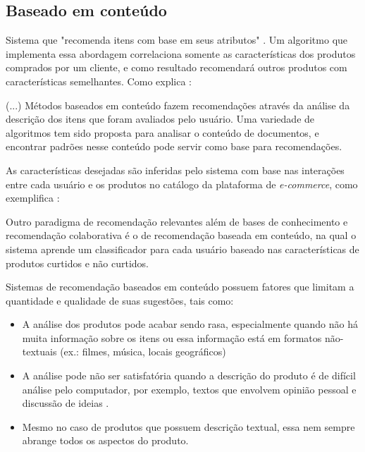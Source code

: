 \subsection{Baseado em conteúdo}
Sistema que "recomenda itens com base em seus atributos" \cite{fressato19}. Um algoritmo que implementa essa abordagem correlaciona somente as características dos produtos comprados por um cliente, e como resultado recomendará outros produtos com características semelhantes. Como explica :

\begin{citacao}
(...) Métodos baseados em conteúdo fazem recomendações através da análise da descrição dos itens que foram avaliados pelo usuário. Uma variedade de algoritmos tem sido proposta para analisar o conteúdo de documentos, e encontrar padrões nesse conteúdo pode servir como base para recomendações.
\end{citacao}

As características desejadas são inferidas pelo sistema com base nas interações entre cada usuário e os produtos no catálogo da plataforma de \textit{e-commerce}, como exemplifica :

\begin{citacao}
Outro paradigma de recomendação relevantes além de bases de conhecimento e recomendação colaborativa é o de recomendação baseada em conteúdo, na qual o sistema aprende um classificador para cada usuário baseado nas características de produtos curtidos e não curtidos.
\end{citacao}

Sistemas de recomendação baseados em conteúdo possuem fatores que limitam a quantidade e qualidade de suas sugestões, tais como:

\begin{itemize}
    \item A análise dos produtos pode acabar sendo rasa, especialmente quando não há muita informação sobre os itens ou essa informação está em formatos não-textuais (ex.: filmes, música, locais geográficos)  \cite{balabanovi97}
    \item A análise pode não ser satisfatória quando a descrição do produto é de difícil análise pelo computador, por exemplo, textos que envolvem opinião pessoal e discussão de ideias \cite{melville02}.
    \item Mesmo no caso de produtos que possuem descrição textual, essa nem sempre abrange todos os aspectos do produto. \cite{balabanovi97}
\end{itemize}

